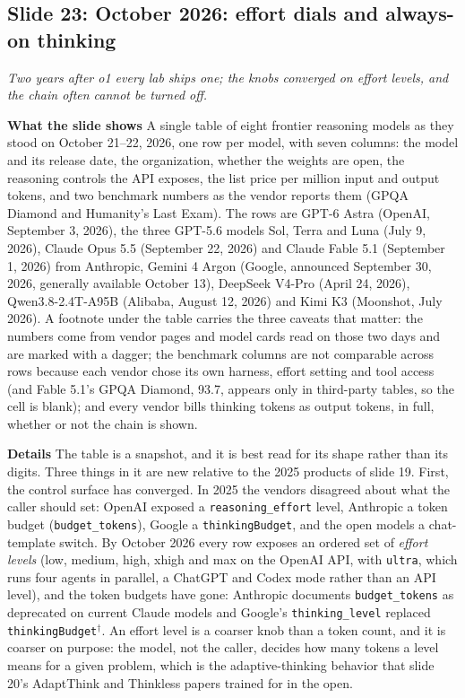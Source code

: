 \documentclass[11pt,letterpaper]{article}
\newcommand{\slide}[3]{%
  \subsection[Slide #1: #2]{Slide #1: #2}%
  {\color{muted}\itshape #3\par}\medskip}
\newcommand{\para}[1]{\medskip\noindent\textbf{#1}\quad}
\begin{document}
\slide{23}{October 2026: effort dials and always-on thinking}{Two years after o1 every lab ships one; the knobs converged on effort levels, and the chain often cannot be turned off.}

\para{What the slide shows} A single table of eight frontier reasoning models as they stood on October 21--22, 2026, one row per model, with seven columns: the model and its release date, the organization, whether the weights are open, the reasoning controls the API exposes, the list price per million input and output tokens, and two benchmark numbers as the vendor reports them (GPQA Diamond and Humanity's Last Exam). The rows are GPT-6 Astra (OpenAI, September 3, 2026), the three GPT-5.6 models Sol, Terra and Luna (July 9, 2026), Claude Opus 5.5 (September 22, 2026) and Claude Fable 5.1 (September 1, 2026) from Anthropic, Gemini 4 Argon (Google, announced September 30, 2026, generally available October 13), DeepSeek V4-Pro (April 24, 2026), Qwen3.8-2.4T-A95B (Alibaba, August 12, 2026) and Kimi K3 (Moonshot, July 2026). A footnote under the table carries the three caveats that matter: the numbers come from vendor pages and model cards read on those two days and are marked with a dagger; the benchmark columns are not comparable across rows because each vendor chose its own harness, effort setting and tool access (and Fable 5.1's GPQA Diamond, 93.7, appears only in third-party tables, so the cell is blank); and every vendor bills thinking tokens as output tokens, in full, whether or not the chain is shown.

\para{Details} The table is a snapshot, and it is best read for its shape rather than its digits. Three things in it are new relative to the 2025 products of slide 19. First, the control surface has converged. In 2025 the vendors disagreed about what the caller should set: OpenAI exposed a \texttt{reasoning\_effort} level, Anthropic a token budget (\texttt{budget\_tokens}), Google a \texttt{thinkingBudget}, and the open models a chat-template switch. By October 2026 every row exposes an ordered set of \emph{effort levels} (low, medium, high, xhigh and max on the OpenAI API, with \texttt{ultra}, which runs four agents in parallel, a ChatGPT and Codex mode rather than an API level), and the token budgets have gone: Anthropic documents \texttt{budget\_tokens} as deprecated on current Claude models and Google's \texttt{thinking\_level} replaced \texttt{thinkingBudget}$^\dagger$. An effort level is a coarser knob than a token count, and it is coarser on purpose: the model, not the caller, decides how many tokens a level means for a given problem, which is the adaptive-thinking behavior that slide 20's AdaptThink and Thinkless papers trained for in the open.
\end{document}
